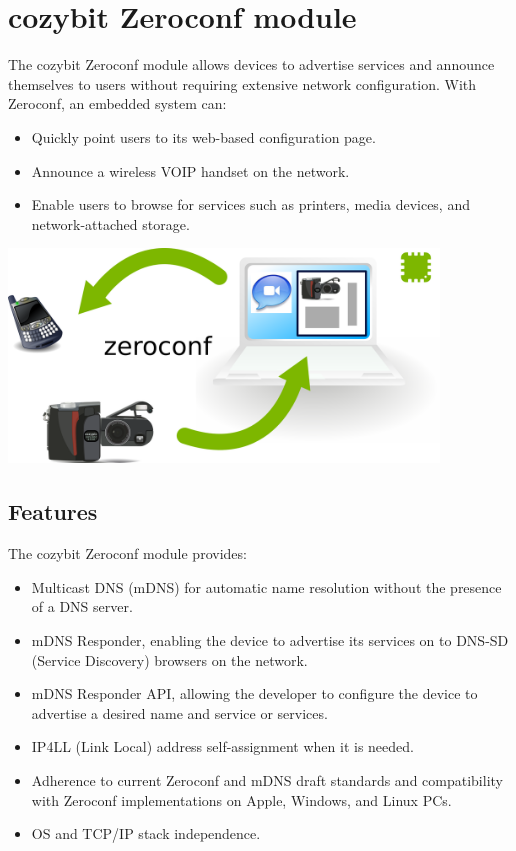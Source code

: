 \documentclass[12pt,landscape,twocolumn]{article}
\begin{document}
\section*{cozybit Zeroconf module}
The cozybit Zeroconf module allows devices to advertise services and announce 
themselves to users without requiring extensive network configuration.  With 
Zeroconf, an embedded system can:

\begin{itemize}
	\item Quickly point users to its web-based configuration page.
	\item Announce a wireless VOIP handset on the network.
	\item Enable users to browse for services such as printers, media
		  devices, and network-attached storage.
\end{itemize}

\vspace{0.5in}
\includegraphics[width=4.5in]{zeroconf.png}
\vspace{0.5in}

\subsection*{Features}

The cozybit Zeroconf module provides:

\begin{itemize}
	\item Multicast DNS (mDNS) for automatic name resolution without the
		  presence of a DNS server.
	\item mDNS Responder, enabling the device to advertise its services on
		  to DNS-SD (Service Discovery) browsers on the network.
	\item mDNS Responder API, allowing the developer to configure the device
		  to advertise a desired name and service or services.
	\item IP4LL (Link Local) address self-assignment when it is needed.
	\item Adherence to current Zeroconf and mDNS draft standards and 
		  compatibility with Zeroconf implementations on Apple, Windows, and
		  Linux PCs.
	\item OS and TCP/IP stack independence.
\end{itemize}
\end{document}
